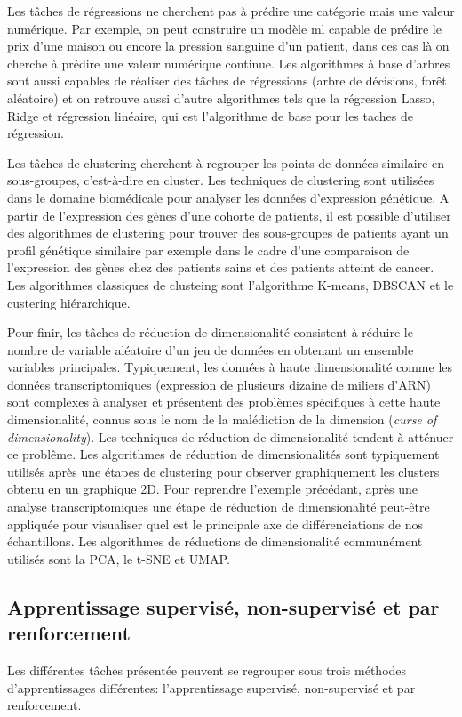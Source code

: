 Les tâches de régressions ne cherchent pas à prédire une catégorie mais une valeur numérique. Par exemple, on peut construire un modèle \gls{ml} capable de prédire le prix d'une maison ou encore la pression sanguine d'un patient, dans ces cas là on cherche à prédire une valeur numérique continue. Les algorithmes à base d'arbres sont aussi capables de réaliser des tâches de régressions (arbre de décisions, forêt aléatoire) et on retrouve aussi d'autre algorithmes tels que la régression Lasso, Ridge et régression linéaire, qui est l'algorithme de base pour les taches de régression.

Les tâches de clustering cherchent à regrouper les points de données similaire en sous-groupes, c'est-à-dire en cluster. Les techniques de clustering sont utilisées dans le domaine biomédicale pour analyser les données d'expression génétique. A partir de l'expression des gènes d'une cohorte de patients, il est possible d'utiliser des algorithmes de clustering pour trouver des sous-groupes de patients ayant un profil génétique similaire par exemple dans le cadre d'une comparaison de l'expression des gènes chez des patients sains et des patients atteint de cancer. Les algorithmes classiques de clusteing sont l'algorithme K-means, DBSCAN et le custering hiérarchique.

Pour finir, les tâches de réduction de dimensionalité consistent à réduire le nombre de variable aléatoire d'un jeu de données en obtenant un ensemble variables principales. Typiquement, les données à haute dimensionalité comme les données transcriptomiques (expression de plusieurs dizaine de miliers d'ARN) sont complexes à analyser et présentent des problèmes spécifiques à cette haute dimensionalité, connus sous le nom de la malédiction de la dimension (\textit{curse of dimensionality}). Les techniques de réduction de dimensionalité tendent à atténuer ce problême. Les algorithmes de réduction de dimensionalités sont typiquement utilisés après une étapes de clustering pour observer graphiquement les clusters obtenu en un graphique 2D. Pour reprendre l'exemple précédant, après une analyse transcriptomiques une étape de réduction de dimensionalité peut-être appliquée pour visualiser quel est le principale axe de différenciations de nos échantillons. Les algorithmes de réductions de dimensionalité communément utilisés sont la PCA, le t-SNE et UMAP.

\subsection{Apprentissage supervisé, non-supervisé et par renforcement}
Les différentes tâches présentée peuvent se regrouper sous trois méthodes d'apprentissages différentes: l'apprentissage supervisé, non-supervisé et par renforcement.

